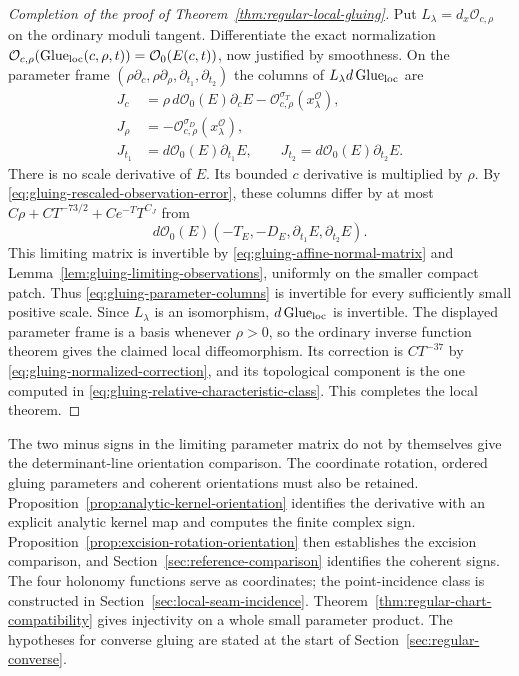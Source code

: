 \documentclass[11pt]{amsart}
\theoremstyle{definition}
\theoremstyle{remark}
\theoremstyle{plain}
\newcommand{\Glue}{\operatorname{Glue}}
\begin{document}
\begin{proof}[Completion of the proof of Theorem~\ref{thm:regular-local-gluing}]
Put $L_\lambda=d_x\mathcal O_{c,\rho}$ on the ordinary moduli
tangent. Differentiate the exact normalization
$\mathcal O_{c,\rho}(\Glue_{\rm loc}(c,\rho,t))=\mathcal O_0(E(c,t))$,
now justified by smoothness. On the parameter frame
$(\rho\partial_c,\rho\partial_\rho,\partial_{t_1},\partial_{t_2})$
the columns of $L_\lambda d\Glue_{\rm loc}$ are
\begin{equation}\label{eq:gluing-parameter-columns}
 \begin{aligned}
 J_c&=\rho\,d\mathcal O_0(E)\partial_cE
                        -\mathcal O^{\sigma_T}_{c,\rho}(x^{\mathcal O}_\lambda),\\
 J_\rho&=-\mathcal O^{\sigma_D}_{c,\rho}(x^{\mathcal O}_\lambda),\\
 J_{t_1}&=d\mathcal O_0(E)\partial_{t_1}E,\qquad
 J_{t_2}=d\mathcal O_0(E)\partial_{t_2}E.
 \end{aligned}
\end{equation}
There is no scale derivative of $E$. Its bounded $c$ derivative
is multiplied by $\rho$. By
\eqref{eq:gluing-rescaled-observation-error}, these columns differ
by at most $C\rho+CT^{-73/2}+Ce^{-T}T^{C_J}$ from
\[
              d\mathcal O_0(E)(-T_E,-D_E,\partial_{t_1}E,\partial_{t_2}E).
\]
This limiting matrix is invertible by
\eqref{eq:gluing-affine-normal-matrix} and
Lemma~\ref{lem:gluing-limiting-observations}, uniformly on the
smaller compact patch. Thus \eqref{eq:gluing-parameter-columns}
is invertible for every sufficiently small positive scale.
Since $L_\lambda$ is an isomorphism, $d\Glue_{\rm loc}$
is invertible. The displayed parameter frame is a basis whenever
$\rho>0$, so the ordinary inverse function theorem gives the
claimed local diffeomorphism. Its correction is $CT^{-37}$ by
\eqref{eq:gluing-normalized-correction}, and its topological
component is the one computed in
\eqref{eq:gluing-relative-characteristic-class}. This completes
the local theorem.
\end{proof}

The two minus signs in the limiting parameter matrix do not by
themselves give the determinant-line orientation comparison. The
coordinate rotation, ordered gluing parameters and coherent orientations
must also be retained.
Proposition~\ref{prop:analytic-kernel-orientation} identifies the
derivative with an explicit analytic kernel map and computes the
finite complex sign. Proposition~\ref{prop:excision-rotation-orientation}
then establishes the excision comparison, and
Section~\ref{sec:reference-comparison} identifies the coherent signs.
The four holonomy functions serve as coordinates; the point-incidence
class is constructed in Section~\ref{sec:local-seam-incidence}.
Theorem~\ref{thm:regular-chart-compatibility} gives injectivity
on a whole small parameter product. The hypotheses for converse
gluing are stated at the start of Section~\ref{sec:regular-converse}.
\end{document}
